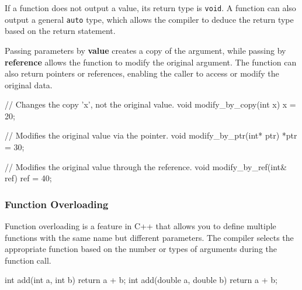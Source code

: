 If a function does not output a value, its return type is \texttt{void}. A function can also output a general \texttt{auto} type, which allows the compiler to deduce the return type based on the return statement.

Passing parameters by \textbf{value} creates a copy of the argument, while passing by \textbf{reference} allows the function to modify the original argument.
The function can also return pointers or references, enabling the caller to access or modify the original data.

\begin{codeblock}[language=C++, numbers = none]
// Changes the copy 'x', not the original value.
void modify_by_copy(int x) { x = 20; }

// Modifies the original value via the pointer.
void modify_by_ptr(int* ptr) { *ptr = 30; }

// Modifies the original value through the reference.
void modify_by_ref(int& ref) { ref = 40; }
\end{codeblock}

\subsubsection{Function Overloading} \label{function-overloading}

Function overloading is a feature in C++ that allows you to define multiple functions with the same name but different parameters. The compiler selects the appropriate function based on the number or types of arguments during the function call.

\vspace{-0.5em}

\begin{multicols}{2}
\begin{codeblock}[language=C++]
int add(int a, int b) {
    return a + b;
}
int add(double a, double b) {
    return a + b;
}
\end{codeblock}
\end{multicols}

    

